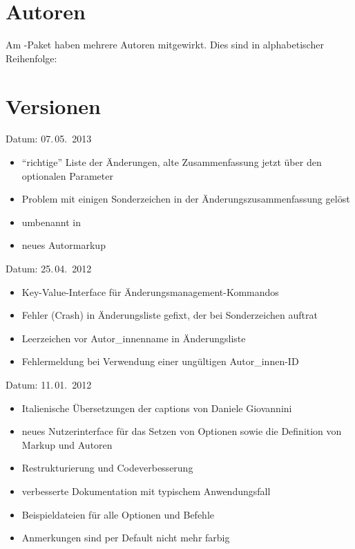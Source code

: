 \section{Autoren}
\label{sec:authors}

Am -Paket haben mehrere Autoren mitgewirkt.
Dies sind in alphabetischer Reihenfolge:



\section{Versionen}
\label{sec:versions}


Datum: 07.\,05.~2013
\begin{itemize}
	\item "`richtige"' Liste der Änderungen, alte Zusammenfassung jetzt über den optionalen Parameter 
	\item Problem mit einigen Sonderzeichen in der Änderungszusammenfassung gelöst
	\item {} umbenannt in 
	\item neues Autormarkup 
\end{itemize}


Datum: 25.\,04.~2012
\begin{itemize}
	\item Key-Value-Interface für Änderungsmanagement-Kommandos
	\item Fehler (Crash) in Änderungsliste gefixt, der bei Sonderzeichen auftrat
	\item Leerzeichen vor Autor\_innenname in Änderungsliste
	\item Fehlermeldung bei Verwendung einer ungültigen Autor\_innen-ID
\end{itemize}


Datum: 11.\,01.~2012
\begin{itemize}
	\item Italienische Übersetzungen der captions von Daniele Giovannini
	\item neues Nutzerinterface für das Setzen von Optionen sowie die Definition von Markup und Autoren
	\item Restrukturierung und Codeverbesserung
	\item verbesserte Dokumentation mit typischem Anwendungsfall
	\item Beispieldateien für alle Optionen und Befehle
	\item Anmerkungen sind per Default nicht mehr farbig
\end{itemize}

